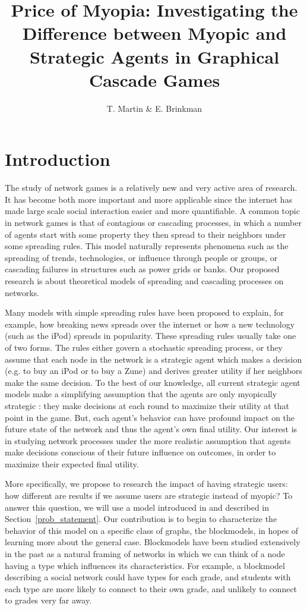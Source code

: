 \documentclass{article}
\title{Price of Myopia: Investigating the Difference between Myopic
  and Strategic Agents in Graphical Cascade Games}
\author{T. Martin \& E. Brinkman}
\begin{document}
\maketitle

\section{Introduction}
\label{intro}

The study of network games is a relatively new and very active area of
research. It has become both more important and more applicable since
the internet has made large scale social interaction easier and more
quantifiable. A common topic in network games is that of contagious or
cascading processes, in which a number of agents start with some
property they then spread to their neighbors under some spreading
rules. This model naturally represents phenomena such as the spreading
of trends, technologies, or influence through people or groups, or
cascading failures in structures such as power grids or banks. Our
proposed research is about theoretical models of spreading and
cascading processes on networks.

Many models with simple spreading rules have been proposed
\cite{Arthur89, Morris00, Watts02} to explain, for example, how
breaking news spreads over the internet or how a new technology (such
as the iPod) spreads in popularity. These spreading rules usually take
one of two forms. The rules either govern a stochastic spreading
process, or they assume that each node in the network is a strategic
agent which makes a decision (e.g. to buy an iPod or to buy a Zune)
and derives greater utility if her neighbors make the same
decision. To the best of our knowledge, all current strategic agent
models make a simplifying assumption that the agents are only
myopically strategic \cite{Chierichetti12}: they make decisions at
each round to maximize their utility at that point in the game. But,
each agent's behavior can have profound impact on the future state of
the network and thus the agent's own final utility. Our interest is in
studying network processes under the more realistic assumption that
agents make decisions conscious of their future influence on outcomes,
in order to maximize their expected final utility.

More specifically, we propose to research the impact of having
strategic users: how different are results if we assume users are
strategic instead of myopic? To answer this question, we will use a
model introduced in \cite{Chierichetti12} and described in
Section~\ref{prob_statement}. Our contribution is to begin to
characterize the behavior of this model on a specific class of graphs,
the blockmodels, in hopes of learning more about the general
case. Blockmodels have been studied extensively in the past
\cite{Wang87, Snijders97} as a natural framing of networks in which we
can think of a node having a type which influences its
characteristics. For example, a blockmodel describing a social network
could have types for each grade, and students with each type are more
likely to connect to their own grade, and unlikely to connect to
grades very far away.
\end{document}
